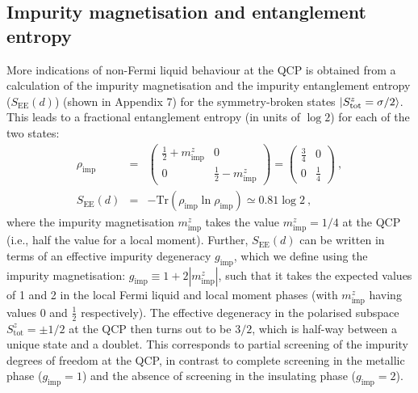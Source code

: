 \subsection{Impurity magnetisation and entanglement entropy}
More indications of non-Fermi liquid behaviour at the QCP is obtained from a calculation of the impurity magnetisation and the impurity entanglement entropy (\(S_\text{EE}(d)\)) (shown in Appendix 7) for the symmetry-broken states \(\ket{S_\text{tot}^z = \sigma/2}\). This 
leads to a fractional entanglement entropy (in units of \(\log 2\)) for each of the two states:
\begin{eqnarray}
	\rho_\text{imp} &=& \begin{pmatrix} \frac{1}{2} + m_\text{imp}^z & 0 \\ 0 & \frac{1}{2} - m_\text{imp}^z \end{pmatrix} = \begin{pmatrix} \frac{3}{4} & 0 \\ 0 & \frac{1}{4} \end{pmatrix}~,\nonumber\\ 
	S_\text{EE}(d) &=& -\text{Tr}\left(\rho_\text{imp} \ln \rho_\text{imp}\right) \simeq 0.81 \log 2~,
\end{eqnarray}
where the impurity magnetisation \(m_\text{imp}^z\) takes the value \(m_\text{imp}^z = 1/4\) at the QCP (i.e., half the value for a local moment).
Further, \(S_\text{EE}(d)\) can be written in terms of an effective impurity degeneracy \(g_\text{imp}\), which we define using the impurity magnetisation: \(g_\text{imp} \equiv 1 + 2|m_\text{imp}^z|\), such that it takes the expected values of 1 and 2 in the local Fermi liquid and local moment phases (with \(m_\text{imp}^z\) having values 0 and \(\frac{1}{2}\) respectively). The effective degeneracy in the polarised subspace \(S_\text{tot}^z = \pm 1/2\) at the QCP then turns out to be \(3/2\), which is half-way between a unique state and a doublet. This corresponds to partial screening of the impurity degrees of freedom at the QCP, in contrast to complete screening in the metallic phase (\(g_\text{imp} = 1\)) and the absence of screening in the insulating phase (\(g_\text{imp} = 2\)).

